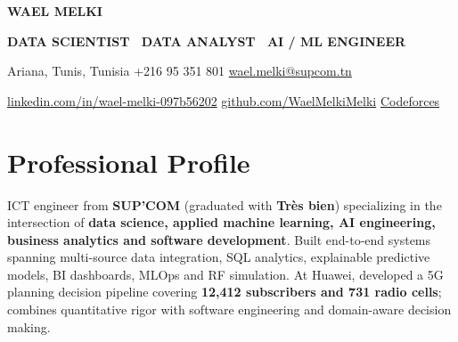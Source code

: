 \documentclass[10pt,a4paper]{article}
\begin{document}
\begin{center}
  {\fontsize{25}{27}\selectfont\bfseries\color{navy}WAEL MELKI}\par
  \vspace{3pt}
  {\fontsize{10.6}{12}\selectfont\bfseries\color{accent}DATA SCIENTIST \textbar\ DATA ANALYST \textbar\ AI / ML ENGINEER}\par
  \vspace{6pt}
  {\fontsize{9}{11}\selectfont Ariana, Tunis, Tunisia \quad\textbar\quad +216 95 351 801 \quad\textbar\quad \href{mailto:wael.melki@supcom.tn}{wael.melki@supcom.tn}}\par
  \vspace{3pt}
  {\fontsize{8.9}{11}\selectfont \href{https://www.linkedin.com/in/wael-melki-097b56202/}{linkedin.com/in/wael-melki-097b56202} \quad\textbar\quad \href{https://github.com/WaelMelkiMelki}{github.com/WaelMelkiMelki} \quad\textbar\quad \href{https://codeforces.com/profile/wael_melki}{Codeforces}}\par
\end{center}
\vspace{-2pt}

\section{Professional Profile}
ICT engineer from \textbf{SUP'COM} (graduated with \textbf{Tr\`es bien}) specializing in the intersection of \textbf{data science, applied machine learning, AI engineering, business analytics and software development}. Built end-to-end systems spanning multi-source data integration, SQL analytics, explainable predictive models, BI dashboards, MLOps and RF simulation. At Huawei, developed a 5G planning decision pipeline covering \textbf{12,412 subscribers and 731 radio cells}; combines quantitative rigor with software engineering and domain-aware decision making.
\end{document}
